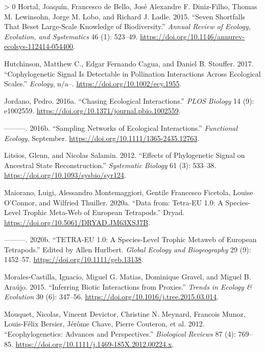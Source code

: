\documentclass[11pt]{article}
\newlength{\cslhangindent}
\newenvironment{CSLReferences}[3] %
 {%
  \setlength{\parindent}{0pt}
  \ifodd #1 \everypar{\setlength{\hangindent}{\cslhangindent}}\ignorespaces\fi
  \ifnum #2 > 0
  \setlength{\parskip}{#2\baselineskip}
  \fi
 }%
 {}
\begin{document}
\begin{CSLReferences}{1}{0}
\leavevmode\hypertarget{ref-Hortal2015SevSho}{}%
Hortal, Joaquín, Francesco de Bello, José Alexandre F. Diniz-Filho,
Thomas M. Lewinsohn, Jorge M. Lobo, and Richard J. Ladle. 2015. {``Seven
Shortfalls That Beset Large-Scale Knowledge of Biodiversity.''}
\emph{Annual Review of Ecology, Evolution, and Systematics} 46 (1):
523--49. \url{https://doi.org/10.1146/annurev-ecolsys-112414-054400}.

\leavevmode\hypertarget{ref-Hutchinson2017CopSig}{}%
Hutchinson, Matthew C., Edgar Fernando Cagua, and Daniel B. Stouffer.
2017. {``Cophylogenetic Signal Is Detectable in Pollination Interactions
Across Ecological Scales.''} \emph{Ecology}, n/a--.
\url{https://doi.org/10.1002/ecy.1955}.

\leavevmode\hypertarget{ref-Jordano2016ChaEcoa}{}%
Jordano, Pedro. 2016a. {``Chasing Ecological Interactions.''} \emph{PLOS
Biology} 14 (9): e1002559.
\url{https://doi.org/10.1371/journal.pbio.1002559}.

\leavevmode\hypertarget{ref-Jordano2016SamNeta}{}%
---------. 2016b. {``Sampling Networks of Ecological Interactions.''}
\emph{Functional Ecology}, September.
\url{https://doi.org/10.1111/1365-2435.12763}.

\leavevmode\hypertarget{ref-Litsios2012EffPhy}{}%
Litsios, Glenn, and Nicolas Salamin. 2012. {``Effects of Phylogenetic
Signal on Ancestral State Reconstruction.''} \emph{Systematic Biology}
61 (3): 533--38. \url{https://doi.org/10.1093/sysbio/syr124}.

\leavevmode\hypertarget{ref-Maiorano2020DatTet}{}%
Maiorano, Luigi, Alessandro Montemaggiori, Gentile Francesco Ficetola,
Louise O'Connor, and Wilfried Thuiller. 2020a. {``Data from: Tetra-EU
1.0: A Species-Level Trophic Meta-Web of European Tetrapods.''} Dryad.
\url{https://doi.org/10.5061/DRYAD.JM63XSJ7B}.

\leavevmode\hypertarget{ref-Maiorano2020TetEu}{}%
---------. 2020b. {``TETRA-EU 1.0: A Species-Level Trophic Metaweb of
European Tetrapods.''} Edited by Allen Hurlbert. \emph{Global Ecology
and Biogeography} 29 (9): 1452--57.
\url{https://doi.org/10.1111/geb.13138}.

\leavevmode\hypertarget{ref-Morales-Castilla2015InfBioa}{}%
Morales-Castilla, Ignacio, Miguel G. Matias, Dominique Gravel, and
Miguel B. Araújo. 2015. {``Inferring Biotic Interactions from
Proxies.''} \emph{Trends in Ecology \& Evolution} 30 (6): 347--56.
\url{https://doi.org/10.1016/j.tree.2015.03.014}.

\leavevmode\hypertarget{ref-Mouquet2012EcoAdv}{}%
Mouquet, Nicolas, Vincent Devictor, Christine N. Meynard, Francois
Munoz, Louis-Félix Bersier, Jérôme Chave, Pierre Couteron, et al. 2012.
{``Ecophylogenetics: Advances and Perspectives.''} \emph{Biological
Reviews} 87 (4): 769--85.
\url{https://doi.org/10.1111/j.1469-185X.2012.00224.x}.


\end{CSLReferences}
\end{document}
